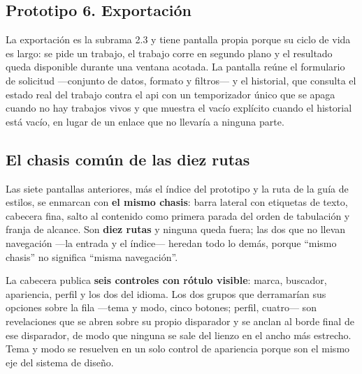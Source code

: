 \clearpage
\subsection{Prototipo 6. Exportación}

La exportación es la subrama 2.3 y tiene pantalla propia porque su ciclo de vida es largo: se pide
un trabajo, el trabajo corre en segundo plano y el resultado queda disponible durante una ventana
acotada. La pantalla reúne el formulario de solicitud ---conjunto de datos, formato y filtros--- y
el historial, que consulta el estado real del trabajo contra el api con un temporizador único que se
apaga cuando no hay trabajos vivos y que muestra el vacío explícito cuando el historial está vacío,
en lugar de un enlace que no llevaría a ninguna parte.


\clearpage
\subsection{El chasis común de las diez rutas}

Las siete pantallas anteriores, más el índice del prototipo y la ruta de la guía de estilos, se
enmarcan con \textbf{el mismo chasis}: barra lateral con etiquetas de texto, cabecera fina, salto
al contenido como primera parada del orden de tabulación y franja de alcance. Son \textbf{diez
rutas} y ninguna queda fuera; las dos que no llevan navegación ---la entrada y el índice---
heredan todo lo demás, porque \enquote{mismo chasis} no significa \enquote{misma navegación}.

La cabecera publica \textbf{seis controles con rótulo visible}: marca, buscador, apariencia, perfil
y los dos del idioma. Los dos grupos que derramarían sus opciones sobre la fila ---tema y modo,
cinco botones; perfil, cuatro--- son revelaciones que se abren sobre su propio disparador y se
anclan al borde final de ese disparador, de modo que ninguna se sale del lienzo en el ancho más
estrecho. Tema y modo se resuelven en un solo control de apariencia porque son el mismo eje del
sistema de diseño.

